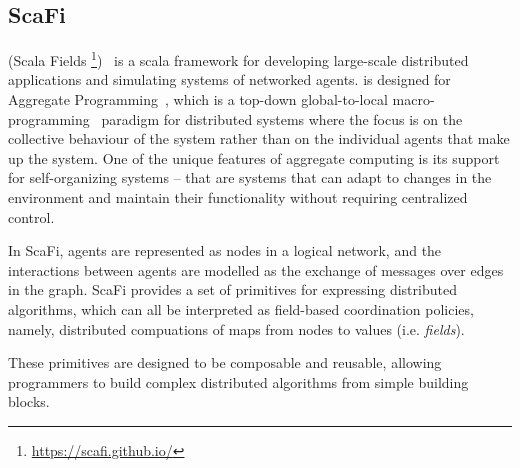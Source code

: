 \subsection{ScaFi}\label{scafi}

\scafi{} (Scala Fields \footnote{\url{https://scafi.github.io/}})~\cite{Casadei2022} 
 is a scala framework for developing large-scale 
 distributed applications and simulating systems of networked agents.
%
\scafi{} is designed for Aggregate Programming~\cite{Beal2015}, 
 which is a top-down global-to-local 
 macro-programming~\cite{Casadei2023} paradigm for distributed systems 
 where the focus is on the collective behaviour of the system 
 rather than on the individual agents that make up the system.
%
One of the unique features of aggregate computing 
 is its support for self-organizing systems -- that are systems 
 that can adapt to changes in the environment and 
 maintain their functionality without requiring centralized control.

In ScaFi, agents are represented as nodes in a logical network, 
 and the interactions between agents are modelled 
 as the exchange of messages over edges in the graph.
%
ScaFi provides a set of primitives for expressing distributed
algorithms, 
 which can all be interpreted as field-based coordination policies, namely, 
 distributed compuations of maps from nodes to values (i.e. \emph{fields}).
 
  These primitives are designed to be composable and reusable, 
 allowing programmers to build complex distributed algorithms from simple building blocks.
%


